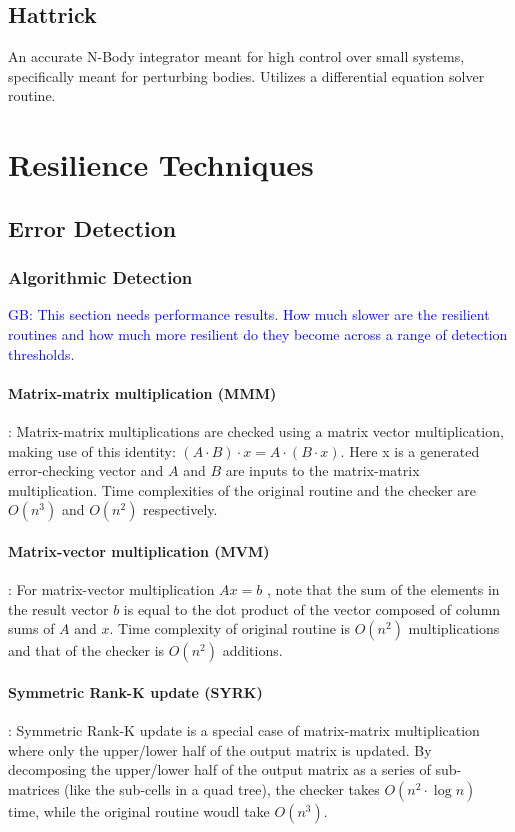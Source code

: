 \documentclass[prodmode,acmtecs]{acmsmall} %
\newcommand{\greg}[1]{%
  \textcolor{blue}{GB: #1}
}
\begin{document}
\subsection{Hattrick}
\label{sec:apps:hattrick}
An accurate N-Body integrator meant for high control over small systems, specifically meant for perturbing bodies. Utilizes a differential equation solver routine.

\section{Resilience Techniques}
\label{sec:res_tech}

\subsection{Error Detection}
\label{sec:res_tech:err_det}
\subsubsection{Algorithmic Detection}
\label{sec:res_tech:err_det:algo}

\greg{This section needs performance results. How much slower are the resilient routines and how much more resilient do they become across a range of detection thresholds.}

\paragraph{Matrix-matrix multiplication (MMM)}: 
Matrix-matrix multiplications are checked using a matrix vector multiplication, making use of this identity: $(A \cdot B) \cdot x = A \cdot (B \cdot x)$. Here x is a generated error-checking vector and $A$ and $B$ are inputs to the matrix-matrix multiplication. Time complexities of the original routine and the checker are $O(n^3)$ and $O(n^2)$ respectively.


\paragraph{Matrix-vector multiplication (MVM)}: 
For matrix-vector multiplication $Ax=b$ , note that the sum of the elements in the result vector $b$ is equal to the dot product of the vector composed of column sums of $A$ and $x$. Time complexity of original routine is $O(n^2)$ multiplications and that of the checker is $O(n^2)$ additions.

\paragraph{Symmetric Rank-K update (SYRK)}:
Symmetric Rank-K update is a special case of matrix-matrix multiplication where only the upper/lower half of the output matrix is updated. By decomposing the upper/lower half of the output matrix as a series of sub-matrices (like the sub-cells in a quad tree), the checker takes $O(n^2 \cdot \log{n})$ time, while the original routine woudl take $O(n^3)$.
\end{document}
